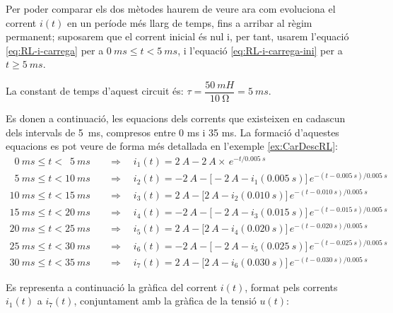 \begin{exemple}
    Per  poder comparar els dos mètodes haurem de veure  ara com evoluciona el corrent $i(t)$ en un període més llarg de temps, fins a arribar al règim permanent; suposarem que el corrent inicial és nul i, per tant, usarem l'equació \eqref{eq:RL-i-carrega} per a $\qty{0}{ms} \leq t < \qty{5}{ms}$, i l'equació \eqref{eq:RL-i-carrega-ini} per a $t \geq \qty{5}{ms}$.

    La constant de temps d'aquest circuit és: $\tau = \dfrac{\qty{50}{mH}}{\qty{10}{\ohm}} = \qty{5}{ms}$.


    Es donen a continuació, les equacions dels corrents que existeixen en cadascun dels intervals de \qty{5}{ms}, compresos entre 0 ms i 35 ms. La formació d'aquestes equacions es pot veure de forma més detallada en l'exemple \vref{ex:CarDescRL}:
    \begin{align*}
      \phantom{0}\qty{0}{ms} \leq t < \phantom{0}\qty{5}{ms}  & \quad\Rightarrow\quad i_1(t) = \qty{2}{A} - \qty{2}{A} \times \,e^{-t/\qty{0,005}{s}} \\
      \phantom{0}\qty{5}{ms} \leq t < \qty{10}{ms} & \quad\Rightarrow\quad i_2(t) = -\qty{2}{A} - \big[-\qty{2}{A} - i_1(\qty{0,005}{s})\big]\, e^{-(t-\qty{0,005}{s})/\qty{0,005}{s}}  \\
      \qty{10}{ms}\leq t < \qty{15}{ms} & \quad\Rightarrow\quad i_3(t) = \qty{2}{A} - \big[\qty{2}{A} - i_2(\qty{0,010}{s})\big]\, e^{-(t-\qty{0,010}{s})/\qty{0,005}{s}} \\
      \qty{15}{ms} \leq t < \qty{20}{ms} & \quad\Rightarrow\quad i_4(t) = -\qty{2}{A} - \big[-\qty{2}{A} - i_3(\qty{0,015}{s})\big]\, e^{-(t-\qty{0,015}{s})/\qty{0,005}{s}}  \\
      \qty{20}{ms}\leq t < \qty{25}{ms} & \quad\Rightarrow\quad i_5(t) = \qty{2}{A} - \big[\qty{2}{A} - i_4(\qty{0,020}{s})\big]\, e^{-(t-\qty{0,020}{s})/\qty{0,005}{s}} \\
      \qty{25}{ms} \leq t < \qty{30}{ms} & \quad\Rightarrow\quad i_6(t) = -\qty{2}{A} - \big[-\qty{2}{A} - i_5(\qty{0,025}{s})\big]\, e^{-(t-\qty{0,025}{s})/\qty{0,005}{s}}  \\
      \qty{30}{ms}\leq t < \qty{35}{ms} & \quad\Rightarrow\quad i_7(t) = \qty{2}{A} - \big[\qty{2}{A} - i_6(\qty{0,030}{s})\big]\, e^{-(t-\qty{0,030}{s})/\qty{0,005}{s}}
    \end{align*}

    Es representa a continuació la gràfica del corrent $i(t)$, format pels corrents $i_1(t)$ a $i_7(t)$, conjuntament amb la gràfica de la tensió $u(t)$:
    \begin{center}
      
    \end{center}


\end{exemple}
